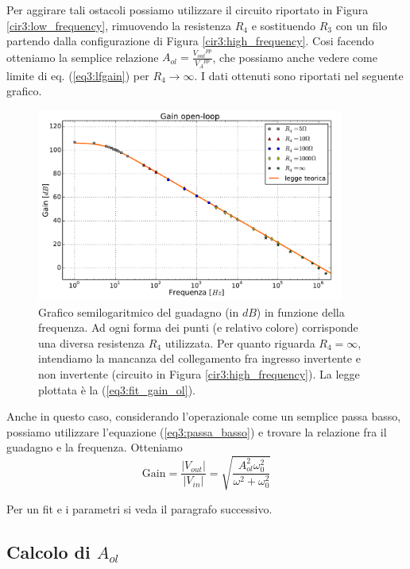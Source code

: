 Per aggirare tali ostacoli possiamo utilizzare il circuito riportato in Figura \ref{cir3:low_frequency}, rimuovendo la resistenza $R_4$ e sostituendo $R_3$ con un filo partendo dalla configurazione di Figura \ref{cir3:high_frequency}.
Cosi facendo otteniamo la semplice relazione $A_{ol}=\frac{{V_{out}}^{pp}}{{V_A}^{pp}}$, che possiamo anche vedere come limite di eq. (\ref{eq3:lfgain}) per $R_4 \rightarrow \infty$.
I dati ottenuti sono riportati nel seguente grafico. 

\begin{figure}[h]
	\centering
	\includegraphics[width=0.9\textwidth]{../E03/latex/gol.pdf}
	\caption{Grafico semilogaritmico del guadagno (in $dB$) in funzione della frequenza. Ad ogni forma dei punti (e relativo colore) corrisponde una diversa resistenza $R_4$ utilizzata. Per quanto riguarda $R_4=\infty$, intendiamo la mancanza del collegamento fra ingresso invertente e non invertente (circuito in Figura \ref{cir3:high_frequency}). La legge plottata è la (\ref{eq3:fit_gain_ol}).}
  \label{cir3:gain_open_loop}
\end{figure}

Anche in questo caso, considerando l'operazionale come un semplice passa basso, possiamo utilizzare l'equazione (\ref{eq3:passa_basso}) e trovare la relazione fra il guadagno e la frequenza. Otteniamo
\begin{equation}
\mathrm{Gain}=\frac{|V_{out}|}{|V_{in}|}=\sqrt{\frac{A_{ol}^2 \omega_0^2}{\omega^2 + \omega_0^2}}
\label{eq3:fit_gain_ol}
\end{equation}

Per un fit e i parametri si veda il paragrafo successivo.

\subsection{Calcolo di $A_{ol}$}
\label{par3:A_ol}

